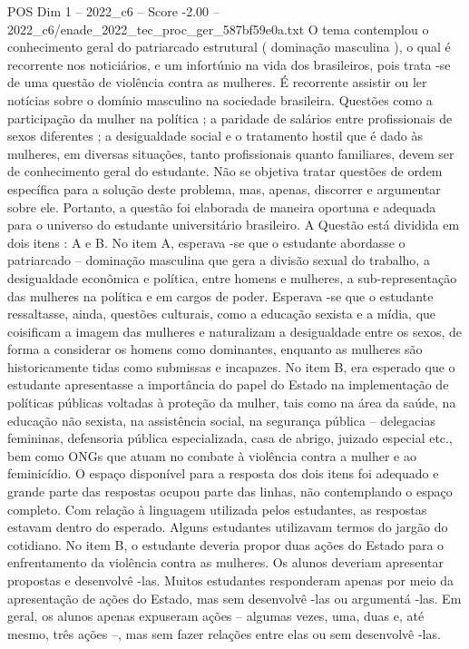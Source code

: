 \begin{textsample}{POS Dim 1 – 2022\_c6 – Score -2.00 – 2022\_c6/enade\_2022\_tec\_proc\_ger\_587bf59e0a.txt}
O tema contemplou o conhecimento geral do patriarcado estrutural ( dominação masculina ), o qual é recorrente nos noticiários, e um infortúnio na vida dos brasileiros, pois trata -se de uma questão de violência contra as mulheres.
É recorrente assistir ou ler notícias sobre o domínio masculino na sociedade brasileira.
Questões como a participação da mulher na política ; a paridade de salários entre profissionais de sexos diferentes ; a desigualdade social e o tratamento hostil que é dado às mulheres, em diversas situações, tanto profissionais quanto familiares, devem ser de conhecimento geral do estudante.
Não se objetiva tratar questões de ordem específica para a solução deste problema, mas, apenas, discorrer e argumentar sobre ele.
Portanto, a questão foi elaborada de maneira oportuna e adequada para o universo do estudante universitário brasileiro.
A Questão está dividida em dois itens : A e B.
No item A, esperava -se que o estudante abordasse o patriarcado – dominação masculina que gera a divisão sexual do trabalho, a desigualdade econômica e política, entre homens e mulheres, a sub-representação das mulheres na política e em cargos de poder.
Esperava -se que o estudante ressaltasse, ainda, questões culturais, como a educação sexista e a mídia, que coisificam a imagem das mulheres e naturalizam a desigualdade entre os sexos, de forma a considerar os homens como dominantes, enquanto as mulheres são historicamente tidas como submissas e incapazes.
No item B, era esperado que o estudante apresentasse a importância do papel do Estado na implementação de políticas públicas voltadas à proteção da mulher, tais como na área da saúde, na educação não sexista, na assistência social, na segurança pública – delegacias femininas, defensoria pública especializada, casa de abrigo, juizado especial etc., bem como ONGs que atuam no combate à violência contra a mulher e ao feminicídio.
O espaço disponível para a resposta dos dois itens foi adequado e grande parte das respostas ocupou parte das linhas, não contemplando o espaço completo.
Com relação à linguagem utilizada pelos estudantes, as respostas estavam dentro do esperado.
Alguns estudantes utilizavam termos do jargão do cotidiano.
No item B, o estudante deveria propor duas ações do Estado para o enfrentamento da violência contra as mulheres.
Os alunos deveriam apresentar propostas e desenvolvê -las.
Muitos estudantes responderam apenas por meio da apresentação de ações do Estado, mas sem desenvolvê -las ou argumentá -las.
Em geral, os alunos apenas expuseram ações – algumas vezes, uma, duas e, até mesmo, três ações –, mas sem fazer relações entre elas ou sem desenvolvê -las.

\end{textsample}
